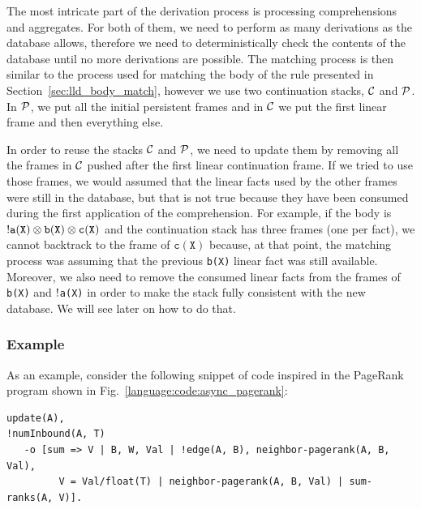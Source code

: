 The most intricate part of the derivation process is processing comprehensions
and aggregates. For both of them, we need to perform as many derivations as the
database allows, therefore we need to deterministically check the contents of
the database until no more derivations are possible.  The matching process is
then similar to the process used for matching the body of the rule presented in
Section~\ref{sec:lld_body_match}, however we use two continuation stacks,
$\mathcal{C}$ and $\mathcal{P}$. In $\mathcal{P}$, we put all the initial
persistent frames and in $\mathcal{C}$ we put the first linear frame and then
everything else.

In order to reuse the stacks $\mathcal{C}$ and $\mathcal{P}$, we need to update
them by removing all the frames in $\mathcal{C}$ pushed after the first linear
continuation frame.  If we tried to use those frames, we would assumed that the
linear facts used by the other frames were still in the database, but that is
not true because they have been consumed during the first application of the
comprehension.  For example, if the body is ${!} \mathtt{a(X)} \otimes
\mathtt{b(X)} \otimes \mathtt{c(X)}$ and the continuation stack has three frames
(one per fact), we cannot backtrack to the frame of $\mathtt{c(X)}$ because, at
that point, the matching process was assuming that the previous \texttt{b(X)}
linear fact was still available.  Moreover, we also need to remove the consumed
linear facts from the frames of \texttt{b(X)} and ${!}$\texttt{a(X)} in order
to make the stack fully consistent with the new database. We will see later on
how to do that.

\subsubsection{Example}

As an example, consider the following snippet of code inspired in the PageRank
program shown in Fig.~\ref{language:code:async_pagerank}:

\begin{Verbatim}[fontsize=\scriptsize]
update(A),
!numInbound(A, T)
   -o [sum => V | B, W, Val | !edge(A, B), neighbor-pagerank(A, B, Val),
         V = Val/float(T) | neighbor-pagerank(A, B, Val) | sum-ranks(A, V)].
\end{Verbatim}


